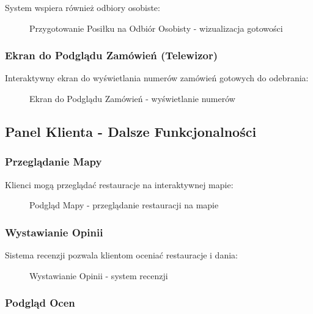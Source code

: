 \documentclass[12pt,a4paper,utf-8]{article}
\begin{document}
System wspiera również odbiory osobiste:

\begin{figure}[H]
    \centering
    \caption{Przygotowanie Posiłku na Odbiór Osobisty  -  wizualizacja gotowości}
    \label{fig:pickup_preparation}
\end{figure}

\subsubsection{Ekran do Podglądu Zamówień (Telewizor)}

Interaktywny ekran do wyświetlania numerów zamówień gotowych do odebrania:

\begin{figure}[H]
    \centering
    \caption{Ekran do Podglądu Zamówień  -  wyświetlanie numerów}
    \label{fig:display_screen}
\end{figure}

\subsection{Panel Klienta - Dalsze Funkcjonalności}

\subsubsection{Przeglądanie Mapy}

Klienci mogą przeglądać restauracje na interaktywnej mapie:

\begin{figure}[H]
    \centering
    \caption{Podgląd Mapy  -  przeglądanie restauracji na mapie}
    \label{fig:map_view}
\end{figure}

\subsubsection{Wystawianie Opinii}

Sistema recenzji pozwala klientom oceniać restauracje i dania:

\begin{figure}[H]
    \centering
    \caption{Wystawianie Opinii  -  system recenzji}
    \label{fig:reviews}
\end{figure}

\subsubsection{Podgląd Ocen}
\end{document}
